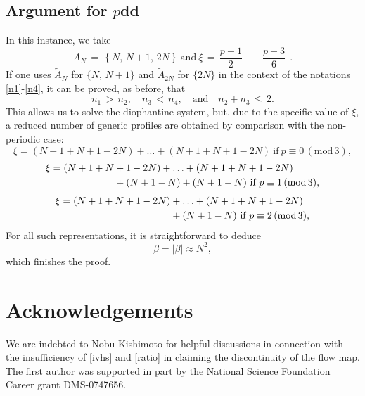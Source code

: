\documentclass{amsart}
\begin{document}
\subsection{Argument for \texorpdfstring{$p$} odd} In this instance, we take
\[
A_N\,=\,\left\{N,\, N+1, \, 2N\right\}\ \text{and} \ \xi\,=\,\frac{p+1}{2}\,+\, \lfloor\frac{p-3}{6}\rfloor.
\]
If one uses $\tilde{A}_N$ for $\{N,\,N+1\}$ and $\tilde{A}_{2N}$ for $\{2N\}$ in the context of the notations \eqref{n1}-\eqref{n4}, it can be proved, as before, that
\[
n_1\,>\,n_2, \quad n_3\,<\,n_4, \quad \text{and} \quad n_2+n_3\, \leq\, 2.\]
This allows us to solve the diophantine system, but, due to the specific value of $\xi$, a reduced number of generic profiles are obtained by comparison with the non-periodic case:
\begin{equation}
\xi=(N+1+N+1-2N)+\ldots+(N+1+N+1-2N) \ \text{if}\ p\equiv 0\, (\text{mod}\,3),
\label{0mod3p}
\end{equation}
\begin{equation}
\aligned
\xi= (N+1+N&+1-2N)+\ldots+(N+1+N+1-2N)\\
&+(N+1-N)+(N+1-N) \ \text{if}\ p\equiv 1\, (\text{mod}\,3),
\endaligned
\label{1mod3p}
\end{equation}
\begin{equation}
\aligned
\xi= (N+1+N+1-2N)&+\ldots+(N+1+N+1-2N)\\
&+(N+1-N) \ \text{if}\ p\equiv 2\, (\text{mod}\,3), 
\endaligned
\label{2mod3p}
\end{equation}
For all such representations, it is straightforward to deduce
\[
\beta= |\beta| \approx N^2,
\]
which finishes the proof.

\section*{Acknowledgements}
We are indebted to Nobu Kishimoto for helpful discussions in connection with the insufficiency of \eqref{ivhs} and \eqref{ratio} in claiming the discontinuity of the flow map. The first author was supported in part by the National Science Foundation Career grant DMS-0747656. 




\end{document}
